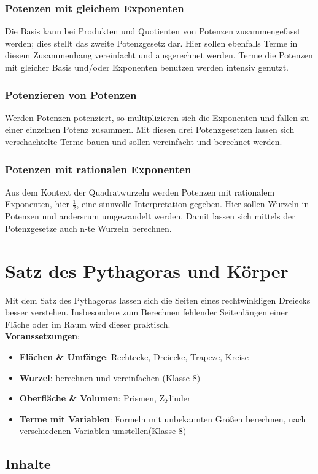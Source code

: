 \documentclass{article}
\begin{document}
\subsubsection*{Potenzen mit gleichem Exponenten}
Die Basis kann bei Produkten und Quotienten von Potenzen zusammengefasst werden; dies stellt das zweite Potenzgesetz dar.
Hier sollen ebenfalls Terme in diesem Zusammenhang vereinfacht und ausgerechnet werden.
Terme die Potenzen mit gleicher Basis und/oder Exponenten benutzen werden intensiv genutzt.
\subsubsection*{Potenzieren von Potenzen}
Werden Potenzen potenziert, so multiplizieren sich die Exponenten und fallen zu einer einzelnen Potenz zusammen.
Mit diesen drei Potenzgesetzen lassen sich verschachtelte Terme bauen und sollen vereinfacht und berechnet werden.
\subsubsection*{Potenzen mit rationalen Exponenten}
Aus dem Kontext der Quadratwurzeln werden Potenzen mit rationalem Exponenten, hier $\frac{1}{2}$, eine sinnvolle Interpretation gegeben.
Hier sollen Wurzeln in Potenzen und andersrum umgewandelt werden.
Damit lassen sich mittels der Potenzgesetze auch n-te Wurzeln berechnen.
\newpage
\section{Satz des Pythagoras und Körper}
Mit dem Satz des Pythagoras lassen sich die Seiten eines rechtwinkligen Dreiecks besser verstehen. Insbesondere zum Berechnen fehlender Seitenlängen einer Fläche oder im Raum wird dieser praktisch.\\
\textbf{Voraussetzungen}:
\begin{itemize}
    \item \textbf{Flächen \& Umfänge}: Rechtecke, Dreiecke, Trapeze, Kreise
    \item \textbf{Wurzel}: berechnen und vereinfachen (Klasse 8) 
    \item \textbf{Oberfläche \& Volumen}: Prismen, Zylinder
    \item \textbf{Terme mit Variablen}: Formeln mit unbekannten Größen berechnen, nach verschiedenen Variablen umstellen(Klasse 8)
\end{itemize}

\subsection{Inhalte}
\end{document}
